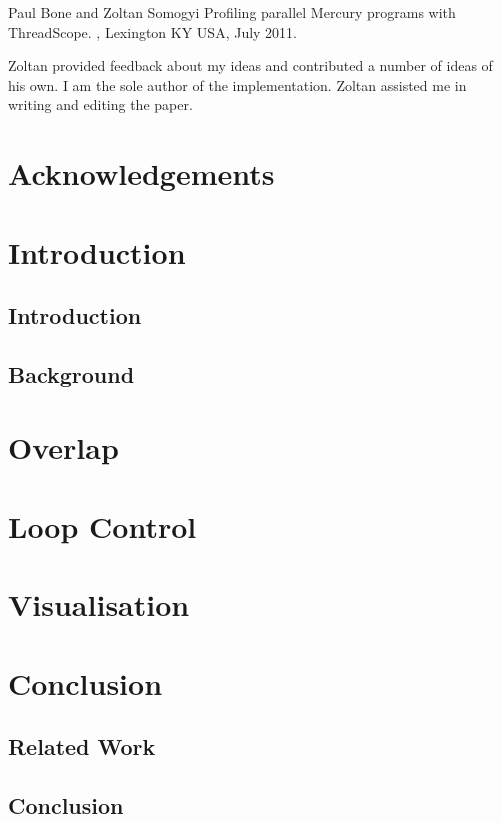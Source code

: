 \documentclass[a4paper,twoside]{report}
\begin{document}
Paul Bone and Zoltan Somogyi
\newblock Profiling parallel Mercury programs with ThreadScope.
,
Lexington KY USA, July 2011.

Zoltan provided feedback about my ideas and contributed a number of ideas of
his own.
I am the sole author of the implementation.
Zoltan assisted me in writing and editing the paper.

\chapter*{Acknowledgements}

\tableofcontents

\listoffigures

\listoftables

\chapter{Introduction}

\section{Introduction}

\section{Background}

\chapter{Overlap}
\label{ref:overlap}


\chapter{Loop Control}
\label{ref:loop_control}


\chapter{Visualisation}
\label{ref:tscope}


\chapter{Conclusion}

\section{Related Work}

\section{Conclusion}



\end{document}
